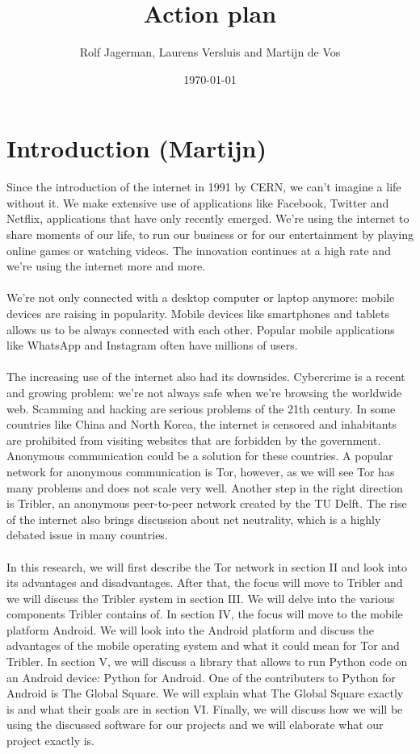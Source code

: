\documentclass[11pt]{article}
\title{Action plan}
\author{Rolf Jagerman, Laurens Versluis and Martijn de Vos}
\date{\today}
\begin{document}
\maketitle

\pagebreak

\section{Introduction (Martijn)}
Since the introduction of the internet in 1991 by CERN, we can't imagine a life without it. We make extensive use of applications like Facebook, Twitter and Netflix, applications that have only recently emerged. We're using the internet to share moments of our life, to run our business or for our entertainment by playing online games or watching videos. The innovation continues at a high rate and we're using the internet more and more.\\\\
We're not only connected with a desktop computer or laptop anymore: mobile devices are raising in popularity. Mobile devices like smartphones and tablets allows us to be always connected with each other. Popular mobile applications like WhatsApp and Instagram often have millions of users.\\\\
The increasing use of the internet also had its downsides. Cybercrime is a recent and growing problem: we're not always safe when we're browsing the worldwide web. Scamming and hacking are serious problems of the 21th century. In some countries like China and North Korea, the internet is censored and inhabitants are prohibited from visiting websites that are forbidden by the government. Anonymous communication could be a solution for these countries. A popular network for anonymous communication is Tor, however, as we will see Tor has many problems and does not scale very well. Another step in the right direction is Tribler, an anonymous peer-to-peer network created by the TU Delft. The rise of the internet also brings discussion about net neutrality, which is a highly debated issue in many countries.\\\\
In this research, we will first describe the Tor network in section II and look into its advantages and disadvantages. After that, the focus will move to Tribler and we will discuss the Tribler system in section III. We will delve into the various components Tribler contains of. In section IV, the focus will move to the mobile platform Android. We will look into the Android platform and discuss the advantages of the mobile operating system and what it could mean for Tor and Tribler. In section V, we will discuss a library that allows to run Python code on an Android device: Python for Android. One of the contributers to Python for Android is The Global Square. We will explain what The Global Square exactly is and what their goals are in section VI. Finally, we will discuss how we will be using the discussed software for our projects and we will elaborate what our project exactly is.
\end{document}
